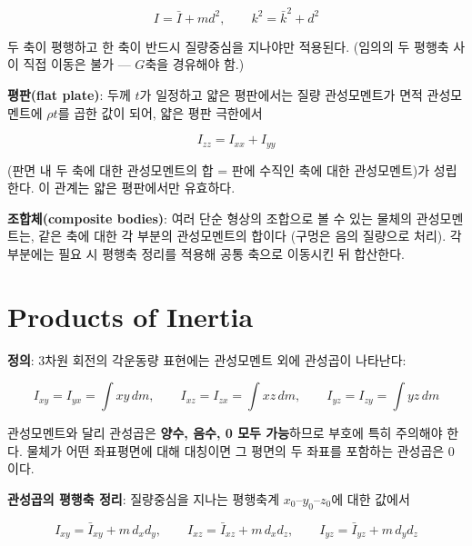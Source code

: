             \begin{equation}
                I = \bar{I} + md^2, \qquad k^2 = \bar{k}^2 + d^2
            \end{equation}
  
            두 축이 평행하고 한 축이 반드시 질량중심을 지나야만 적용된다. (임의의 두 평행축 사이 직접 이동은 불가 --- $G$축을 경유해야 함.)

        \textbf{평판(flat plate)}:
            두께 $t$가 일정하고 얇은 평판에서는 질량 관성모멘트가 면적 관성모멘트에 $\rho t$를 곱한 값이 되어, 얇은 평판 극한에서
  
            \begin{equation}
                I_{zz} = I_{xx} + I_{yy}
            \end{equation}
    
            (판면 내 두 축에 대한 관성모멘트의 합 = 판에 수직인 축에 대한 관성모멘트)가 성립한다. 이 관계는 얇은 평판에서만 유효하다.

        \textbf{조합체(composite bodies)}:
            여러 단순 형상의 조합으로 볼 수 있는 물체의 관성모멘트는, 같은 축에 대한 각 부분의 관성모멘트의 합이다 (구멍은 음의 질량으로 처리). 각 부분에는 필요 시 평행축 정리를 적용해 공통 축으로 이동시킨 뒤 합산한다.

    \section{Products of Inertia} \label{sec:products_of_inertia}
        \textbf{정의}:
            3차원 회전의 각운동량 표현에는 관성모멘트 외에 관성곱이 나타난다:
  
            \begin{equation}
                I_{xy} = I_{yx} = \int xy\,dm, \qquad
                I_{xz} = I_{zx} = \int xz\,dm, \qquad
                I_{yz} = I_{zy} = \int yz\,dm
            \end{equation}

            관성모멘트와 달리 관성곱은 \textbf{양수, 음수, 0 모두 가능}하므로 부호에 특히 주의해야 한다. 물체가 어떤 좌표평면에 대해 대칭이면 그 평면의 두 좌표를 포함하는 관성곱은 0이다.

        \textbf{관성곱의 평행축 정리}:
            질량중심을 지나는 평행축계 $x_0$--$y_0$--$z_0$에 대한 값에서

            \begin{equation}
                I_{xy} = \bar{I}_{xy} + m\,d_x d_y, \qquad
                I_{xz} = \bar{I}_{xz} + m\,d_x d_z, \qquad
                I_{yz} = \bar{I}_{yz} + m\,d_y d_z
            \end{equation}

